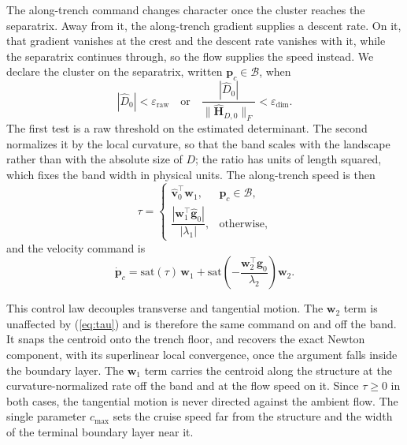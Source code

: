 \documentclass[lettersize,journal]{IEEEtran}
\begin{document}
The along-trench command changes character once the cluster reaches the
separatrix. Away from it, the along-trench gradient supplies a descent
rate. On it, that gradient vanishes at the crest and the descent rate
vanishes with it, while the separatrix continues through, so the flow
supplies the speed instead. We declare the cluster on the separatrix,
written $\mathbf{p}_c \in \mathcal{B}$, when
\begin{equation}
    |\hat{D}_0| < \varepsilon_{\mathrm{raw}}
    \quad\text{or}\quad
    \frac{|\hat{D}_0|}{\|\hat{\mathbf{H}}_{D,0}\|_F}
        < \varepsilon_{\dim}.
    \label{eq:flow_band}
\end{equation}
The first test is a raw threshold on the estimated determinant. The
second normalizes it by the local curvature, so that the band scales
with the landscape rather than with the absolute size of $D$; the ratio
has units of length squared, which fixes the band width in physical
units. The along-trench speed is then
\begin{equation}
    \tau =
    \begin{cases}
        \hat{\mathbf{v}}_0^\top \mathbf{w}_1,
            & \mathbf{p}_c \in \mathcal{B}, \\[6pt]
        \dfrac{|\mathbf{w}_1^\top \hat{\mathbf{g}}_0|}{|\lambda_1|},
            & \text{otherwise},
    \end{cases}
    \label{eq:tau}
\end{equation}
and the velocity command is
\begin{equation}
    \dot{\mathbf{p}}_c =
    \mathrm{sat}(\tau)\,\mathbf{w}_1
    + \mathrm{sat}\!\left(-\frac{\mathbf{w}_2^\top
      \hat{\mathbf{g}}_0}{\lambda_2}\right)\mathbf{w}_2.
    \label{eq:d_law}
\end{equation}

This control law decouples transverse and tangential motion. The
$\mathbf{w}_2$ term is unaffected by (\ref{eq:tau}) and is therefore the
same command on and off the band. It snaps the centroid onto the trench
floor, and recovers the exact Newton component, with its superlinear
local convergence, once the argument falls inside the boundary layer.
The $\mathbf{w}_1$ term carries the centroid along the structure at the
curvature-normalized rate off the band and at the flow speed on it.
Since $\tau \geq 0$ in both cases, the tangential motion is never
directed against the ambient flow. The single parameter $c_{\max}$ sets
the cruise speed far from the structure and the width of the terminal
boundary layer near it.
\end{document}
